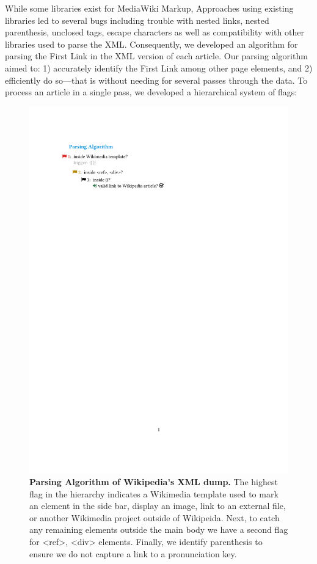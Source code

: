 \documentclass[11pt]{report}
\begin{document}
While some libraries exist for MediaWiki Markup,
Approaches using existing libraries led to several bugs 
including trouble with nested links, nested parenthesis, unclosed tags, escape characters 
as well as compatibility with other libraries used to parse the XML.
Consequently,  we developed an algorithm for parsing the First Link in the XML version of each article.
Our parsing algorithm aimed to: 
1) accurately identify the First Link among other page elements, and 
2) efficiently do so---that is without needing for several passes through the data.
To process an article in a single pass, we developed a hierarchical system of flags:
\begin{figure}[tp!]
  \includegraphics[width=\columnwidth]{graphics/flags.pdf}  
  \caption{
    \textbf{Parsing Algorithm of Wikipedia's XML dump.}
The highest flag in the hierarchy indicates a Wikimedia template used to mark an element in the side bar, display an image, link to an external file, or another Wikimedia project outside of Wikipeida. Next, to catch any remaining elements outside the main body we have a second flag for <ref>, <div> elements. Finally, we identify parenthesis to ensure we do not capture a link to a pronunciation key.}
  \label{fig:parsing algorithm}
\end{figure}
\end{document}

